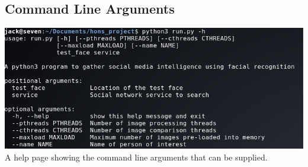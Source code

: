 \documentclass{article}
\begin{document}
\begin{appendices}
\section{Command Line Arguments}
\label{appendix:commandlineargs}
\includegraphics[width=\linewidth]{res/facegather_cmd_line_args.png}
A help page showing the command line arguments that can be supplied.

\end{appendices}
\end{document}
